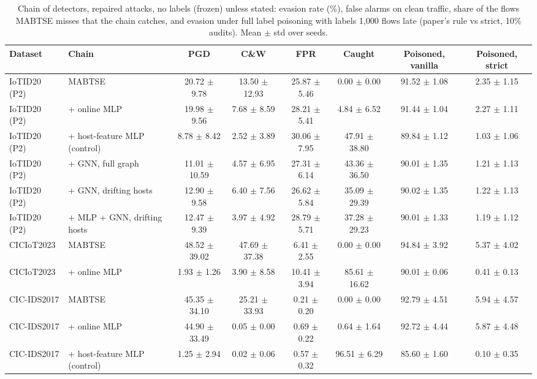 \begin{table}[t]
\centering
\caption{Chain of detectors, repaired attacks, no labels (frozen) unless stated: evasion rate (\%), false alarms on clean traffic, share of the flows MABTSE misses that the chain catches, and evasion under full label poisoning with labels 1{,}000 flows late (paper's rule vs strict, 10\% audits). Mean $\pm$ std over seeds.}
\label{tab:cascade}
\footnotesize
\setlength{\tabcolsep}{3pt}
\begin{tabular}{llcccccc}
\toprule
Dataset & Chain & PGD & C\&W & FPR & Caught & Poisoned, vanilla & Poisoned, strict \\
\midrule
IoTID20 (P2) & MABTSE & 20.72 $\pm$ 9.78 & 13.50 $\pm$ 12.93 & 25.87 $\pm$ 5.46 & 0.00 $\pm$ 0.00 & 91.52 $\pm$ 1.08 & 2.35 $\pm$ 1.15 \\
IoTID20 (P2) & + online MLP & 19.98 $\pm$ 9.56 & 7.68 $\pm$ 8.59 & 28.21 $\pm$ 5.41 & 4.84 $\pm$ 6.52 & 91.44 $\pm$ 1.04 & 2.27 $\pm$ 1.11 \\
IoTID20 (P2) & + host-feature MLP (control) & 8.78 $\pm$ 8.42 & 2.52 $\pm$ 3.89 & 30.06 $\pm$ 7.95 & 47.91 $\pm$ 38.80 & 89.84 $\pm$ 1.12 & 1.03 $\pm$ 1.06 \\
IoTID20 (P2) & + GNN, full graph & 11.01 $\pm$ 10.59 & 4.57 $\pm$ 6.95 & 27.31 $\pm$ 6.14 & 43.36 $\pm$ 36.50 & 90.01 $\pm$ 1.35 & 1.21 $\pm$ 1.13 \\
IoTID20 (P2) & + GNN, drifting hosts & 12.90 $\pm$ 9.58 & 6.40 $\pm$ 7.56 & 26.62 $\pm$ 5.84 & 35.09 $\pm$ 29.39 & 90.02 $\pm$ 1.35 & 1.22 $\pm$ 1.13 \\
IoTID20 (P2) & + MLP + GNN, drifting hosts & 12.47 $\pm$ 9.39 & 3.97 $\pm$ 4.92 & 28.79 $\pm$ 5.71 & 37.28 $\pm$ 29.23 & 90.01 $\pm$ 1.33 & 1.19 $\pm$ 1.12 \\
CICIoT2023 & MABTSE & 48.52 $\pm$ 39.02 & 47.69 $\pm$ 37.38 & 6.41 $\pm$ 2.55 & 0.00 $\pm$ 0.00 & 94.84 $\pm$ 3.92 & 5.37 $\pm$ 4.02 \\
CICIoT2023 & + online MLP & 1.93 $\pm$ 1.26 & 3.90 $\pm$ 8.58 & 10.41 $\pm$ 3.94 & 85.61 $\pm$ 16.62 & 90.01 $\pm$ 0.06 & 0.41 $\pm$ 0.13 \\
CIC-IDS2017 & MABTSE & 45.35 $\pm$ 34.10 & 25.21 $\pm$ 33.93 & 0.21 $\pm$ 0.20 & 0.00 $\pm$ 0.00 & 92.79 $\pm$ 4.51 & 5.94 $\pm$ 4.57 \\
CIC-IDS2017 & + online MLP & 44.90 $\pm$ 33.49 & 0.05 $\pm$ 0.00 & 0.69 $\pm$ 0.22 & 0.64 $\pm$ 1.64 & 92.72 $\pm$ 4.44 & 5.87 $\pm$ 4.48 \\
CIC-IDS2017 & + host-feature MLP (control) & 1.25 $\pm$ 2.94 & 0.02 $\pm$ 0.06 & 0.57 $\pm$ 0.32 & 96.51 $\pm$ 6.29 & 85.60 $\pm$ 1.60 & 0.10 $\pm$ 0.35 \\

\end{tabular}
\end{table}
